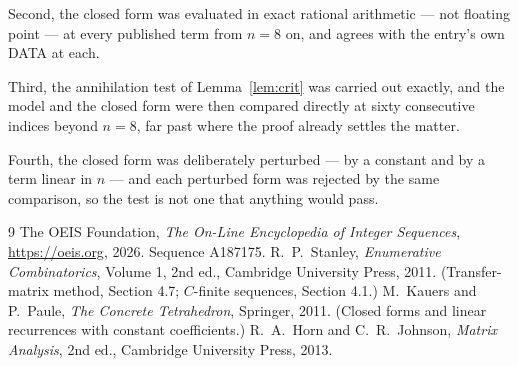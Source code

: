 \documentclass[11pt,a4paper]{article}
\theoremstyle{plain}
\theoremstyle{definition}
\begin{document}
Second, the closed form was evaluated in exact rational arithmetic --- not floating point ---
at every published term from $n=8$ on, and agrees with the entry's own DATA at each.

Third, the annihilation test of Lemma~\ref{lem:crit} was carried out exactly, and the model
and the closed form were then compared directly at sixty consecutive indices beyond
$n=8$, far past where the proof already settles the matter.

Fourth, the closed form was deliberately perturbed --- by a constant and by a term linear in
$n$ --- and each perturbed form was rejected by the same comparison, so the test is not one
that anything would pass.

\begin{thebibliography}{9}
 The OEIS Foundation, \emph{The On-Line Encyclopedia of Integer
Sequences}, \url{https://oeis.org}, 2026. Sequence A187175.
 R.~P.~Stanley, \emph{Enumerative Combinatorics}, Volume 1, 2nd ed.,
Cambridge University Press, 2011. (Transfer-matrix method, Section 4.7; $C$-finite sequences,
Section 4.1.)
 M.~Kauers and P.~Paule, \emph{The Concrete Tetrahedron}, Springer, 2011.
(Closed forms and linear recurrences with constant coefficients.)
 R.~A.~Horn and C.~R.~Johnson, \emph{Matrix Analysis}, 2nd ed., Cambridge
University Press, 2013.
\end{thebibliography}
\end{document}
